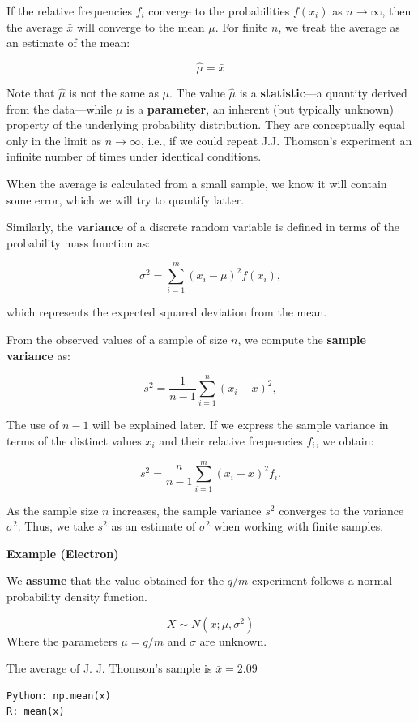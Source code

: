 \documentclass[
]{book}
\begin{document}
If the relative frequencies \(f_i\) converge to the probabilities \(f(x_i)\) as \(n \to \infty\), then the average \(\bar{x}\) will converge to the mean \(\mu\). For finite \(n\), we treat the average as an estimate of the mean:

\[
\hat{\mu} = \bar{x}
\]

Note that \(\hat{\mu}\) is not the same as \(\mu\). The value \(\hat{\mu}\) is a \textbf{statistic}---a quantity derived from the data---while \(\mu\) is a \textbf{parameter}, an inherent (but typically unknown) property of the underlying probability distribution. They are conceptually equal only in the limit as \(n \to \infty\), i.e., if we could repeat J.J. Thomson's experiment an infinite number of times under identical conditions.

When the average is calculated from a small sample, we know it will contain some error, which we will try to quantify latter.

Similarly, the \textbf{variance} of a discrete random variable is defined in terms of the probability mass function as:

\[
\sigma^2 = \sum_{i=1}^m (x_i - \mu)^2 f(x_i),
\]

which represents the expected squared deviation from the mean.

From the observed values of a sample of size \(n\), we compute the \textbf{sample variance} as:

\[
s^2 = \frac{1}{n - 1} \sum_{i=1}^n (x_i - \bar{x})^2,
\]

The use of \(n - 1\) will be explained later. If we express the sample variance in terms of the distinct values \(x_i\) and their relative frequencies \(f_i\), we obtain:

\[
s^2 = \frac{n}{n - 1} \sum_{i=1}^m (x_i - \bar{x})^2 f_i.
\]

As the sample size \(n\) increases, the sample variance \(s^2\) converges to the variance \(\sigma^2\). Thus, we take \(s^2\) as an estimate of \(\sigma^2\) when working with finite samples.

\textbf{Example (Electron)}

We \textbf{assume} that the value obtained for the \(q/m\) experiment follows a normal probability density function.

\[X \sim N(x; \mu, \sigma^2)\]
Where the parameters \(\mu=q/m\) and \(\sigma\) are unknown.

The average of J. J. Thomson's sample is \(\bar{x}=2.09\)

\begin{verbatim}
Python: np.mean(x)
R: mean(x)
\end{verbatim}
\end{document}
